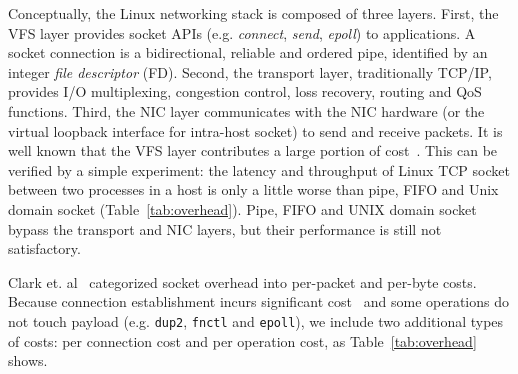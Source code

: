 Conceptually, the Linux networking stack is composed of three layers. First, the VFS layer provides socket APIs (e.g. \emph{connect}, \emph{send}, \emph{epoll}) to applications. A socket connection is a bidirectional, reliable and ordered pipe, identified by an integer \emph{file descriptor} (FD).
Second, the transport layer, traditionally TCP/IP, provides I/O multiplexing, congestion control, loss recovery, routing and QoS functions.
Third, the NIC layer communicates with the NIC hardware (or the virtual loopback interface for intra-host socket) to send and receive packets.
It is well known that the VFS layer contributes a large portion of cost~\cite{clark1989analysis,boyd2010analysis}.
This can be verified by a simple experiment: the latency and throughput of Linux TCP socket between two processes in a host is only a little worse than pipe, FIFO and Unix domain socket (Table~\ref{tab:overhead}).
Pipe, FIFO and UNIX domain socket bypass the transport and NIC layers, but their performance is still not satisfactory.

Clark et. al~\cite{clark1989analysis} categorized socket overhead into per-packet and per-byte costs.
Because connection establishment incurs significant cost~\cite{jeong2014mtcp,lin2016scalable} and some operations do not touch payload (e.g. \texttt{dup2}, \texttt{fnctl} and \texttt{epoll}), we include two additional types of costs: per connection cost and per operation cost, as Table~\ref{tab:overhead} shows.

